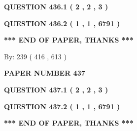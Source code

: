 \documentclass[12pt]{article}
\begin{document}
\vspace{0.2in}
  
{\textbf{\Large{QUESTION
436.1 
 ( 2 , 2 , 3 )
}}}
  
  
  
\vspace{0.2in}
  
{\textbf{\Large{QUESTION
436.2 
 ( 1 , 1 , 6791 )
}}}
  
  
   
   
 \vspace{0.2in}
 
   
   
   
   
\vspace{1.0in} 
{\textbf{\large{ *** END OF PAPER, THANKS *** }}} 
   
   
\hspace{1.0in} By: 
 239 ( 416 ,  613 )
   
   
   
   
\newpage 
\setcounter{page}{ 
   437001 } 
   
   
   
   
 {\textbf{ \Large{ PAPER NUMBER  437  }}}
   
   
\vspace{0.2in}
   
   
   
   
   
   
 \vspace{0.2in}
 
 
 
 
   
   
  
\vspace{0.2in}
  
{\textbf{\Large{QUESTION
437.1 
 ( 2 , 2 , 3 )
}}}
  
  
  
\vspace{0.2in}
  
{\textbf{\Large{QUESTION
437.2 
 ( 1 , 1 , 6791 )
}}}
  
  
   
   
 \vspace{0.2in}
 
   
   
   
   
\vspace{1.0in} 
{\textbf{\large{ *** END OF PAPER, THANKS *** }}} 
   
\end{document}
